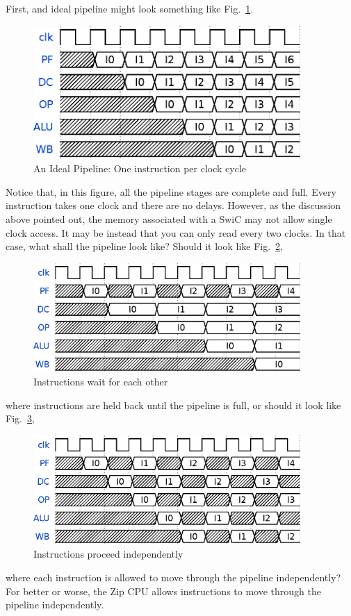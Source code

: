 \documentclass{gqtekspec}
\begin{document}
\begin{itemize}
	First, and ideal pipeline might look something like
	Fig.~\ref{fig:ideal-pipeline}.
\begin{figure}
\begin{center}
\includegraphics[width=4in]{../gfx/fullpline.eps}
\caption{An Ideal Pipeline: One instruction per clock cycle}\label{fig:ideal-pipeline}
\end{center}\end{figure}
	Notice that, in this figure, all the pipeline stages are complete and
	full.  Every instruction takes one clock and there are no delays.
	However, as the discussion above pointed out, the memory associated
	with a SwiC may not allow single clock access.  It may be instead
	that you can only read every two clocks.  In that case, what shall
	the pipeline look like?  Should it look like
	Fig.~\ref{fig:waiting-pipeline},
\begin{figure}\begin{center}
\includegraphics[width=4in]{../gfx/stuttra.eps}
\caption{Instructions wait for each other}\label{fig:waiting-pipeline}
\end{center}\end{figure}
	where instructions are held back until the pipeline is full, or should
	it look like Fig.~\ref{fig:independent-pipeline},
\begin{figure}\begin{center}
\includegraphics[width=4in]{../gfx/stuttrb.eps}
\caption{Instructions proceed independently}\label{fig:independent-pipeline}
\end{center}\end{figure}
	where each instruction is allowed to move through the pipeline
	independently?  For better or worse, the Zip CPU allows instructions
	to move through the pipeline independently.


\end{itemize}
\end{document}
